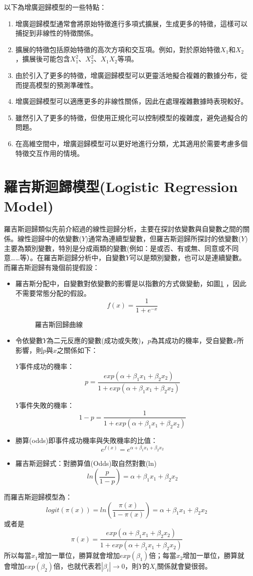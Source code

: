 \documentclass[12pt, a4paper]{article}
\begin{document}
以下為增廣迴歸模型的一些特點：
\begin{enumerate}
\item 增廣迴歸模型通常會將原始特徵進行多項式擴展，生成更多的特徵，這樣可以捕捉到非線性的特徵關係。
\item  擴展的特徵包括原始特徵的高次方項和交互項。例如，對於原始特徵$X_1$和$X_2$，擴展後可能包含$X_1^2$、$X_2^2$、$X_1X_2$等項。
\item 由於引入了更多的特徵，增廣迴歸模型可以更靈活地擬合複雜的數據分布，從而提高模型的預測準確性。
\item 增廣迴歸模型可以適應更多的非線性關係，因此在處理複雜數據時表現較好。
\item 雖然引入了更多的特徵，但使用正規化可以控制模型的複雜度，避免過擬合的問題。
\item 在高維空間中，增廣迴歸模型可以更好地進行分類，尤其適用於需要考慮多個特徵交互作用的情境。
\end{enumerate}
\section{羅吉斯迴歸模型(Logistic Regression Model)}
羅吉斯迴歸類似先前介紹過的線性迴歸分析，主要在探討依變數與自變數之間的關係。線性迴歸中的依變數($Y$)通常為連續型變數，但羅吉斯迴歸所探討的依變數($Y$)主要為類別變數，特別是分成兩類的變數(例如：是或否、有或無、同意或不同意……等）。在羅吉斯迴歸分析中，自變數$Y$可以是類別變數，也可以是連續變數。而羅吉斯迴歸有幾個前提假設：
\begin{itemize}
\item 羅吉斯分配中，自變數對依變數的影響是以指數的方式做變動，如圖\ref{fig:logistic_curve} ，因此不需要常態分配的假設。
$$f(x)=\frac{1}{1+e^{-x}}$$
\begin{figure}[H]
    \caption{羅吉斯回歸曲線}
    \label{fig:logistic_curve}
\end{figure}
\item 令依變數$Y$為二元反應的變數(成功或失敗)，$p$為其成功的機率，受自變數$x$所影響，則$p$與$x$之關係如下：

$Y$事件成功的機率：$$p=\frac{exp(\alpha+\beta_1x_1+\beta_2x_2)}{1+exp(\alpha+\beta_1x_1+\beta_2x_2)}$$

$Y$事件失敗的機率：$$1-p=\frac{1}{1+exp(\alpha+\beta_1x_1+\beta_2x_2)}$$

\item 勝算(odds)即事件成功機率與失敗機率的比值：
$$e^{f(x)}=e^{\alpha+\beta_1x_1+\beta_2x_2}$$

\item 羅吉斯迴歸式：對勝算值(Odds)取自然對數(ln)
$$ln\left(\frac{p}{1-p}\right)=\alpha+\beta_1x_1+\beta_2x_2$$
\end{itemize}
而羅吉斯迴歸模型為：
$$logit(\pi(x))=ln\left(\frac{\pi(x)}{1-\pi(x)}\right)=\alpha+\beta_1x_1+\beta_2x_2$$
或者是
$$\pi(x)=\frac{exp(\alpha+\beta_1x_1+\beta_2x_2)}{1+exp(\alpha+\beta_1x_1+\beta_2x_2)}$$
所以每當$x_1$增加一單位，勝算就會增加$exp(\beta_1)$倍；每當$x_2$增加一單位，勝算就會增加$exp(\beta_2)$倍，也就代表若$\left|\beta_i\right|\rightarrow0$，則$Y$的$X_i$關係就會變很弱。
\end{document}
